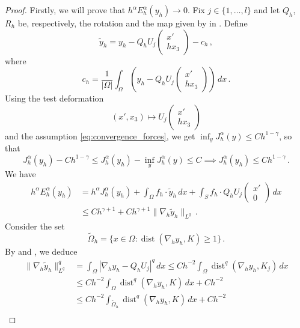 \documentclass[10pt,a4paper]{amsart}
\DeclareMathOperator{\dist}{dist}
\begin{document}
\begin{proof}
	Firstly, we will prove that $h^\alpha E_h^\alpha(y_h) \to 0$. Fix $j \in \{1, \dots, l\}$ and let $Q_h$, $R_h$ be, respectively, the rotation and the map given by in . Define
	\[
	\tilde y_h = y_h  - Q_h U_j\begin{pmatrix}
	x' \\ h x_3
	\end{pmatrix} - c_h \,,
	\] 
	where
	\[
	c_h = \dfrac{1}{|\Omega|}\int_\Omega \left(y_h - Q_h U_j \begin{pmatrix}
	x' \\ hx_3
	\end{pmatrix}\right) \, dx \,.
	\]
	Using the test deformation
	\[
	(x', x_3) \mapsto U_j \begin{pmatrix}
	x' \\ hx_3
	\end{pmatrix}
	\]
	and the assumption \eqref{eq:convergence_forces}, we get $\inf_y J_h^\alpha(y) \leq Ch^{1-\gamma}$, so that
	\[
		J_h^\alpha(y_h) - C h^{1-\gamma} \leq J_h^\alpha(y_h) - \inf_y J_h^\alpha(y) \leq C \implies J_h^\alpha(y_h) \leq Ch^{1-\gamma} \,.
	\]
	We have
	\begin{equation}\label{eq:dim_forze_eq_1}
	\begin{aligned}
	h^\alpha E_h^\alpha(y_h) & = h^\alpha J_h^\alpha(y_h) + \int_\Omega f_h \cdot \tilde y_h \, dx  + \int_S f_h \cdot Q_hU_j \begin{pmatrix}
	x' \\ 0
	\end{pmatrix} \, dx \\
	& \leq Ch^{\gamma+1} + Ch^{\gamma+1}\|\nabla_h \tilde y_h\|_{L^q} \,.
	\end{aligned}
	\end{equation}
	Consider the set
	\[
	\tilde \Omega_h = \{x \in \Omega \colon \dist(\nabla_h y_h, K) \geq 1\}\,.
	\]
	By  and , we deduce
	\begin{equation}\label{eq:dim_forze_eq_2}
		\begin{aligned}
		\|\nabla_h \tilde y_h\|_{L^q}^q & = \int_\Omega |\nabla_h y_h - Q_hU_j|^q \, dx \leq Ch^{-2} \int_\Omega \dist^q(\nabla_h y_h, K_j) \, dx\\
		& \leq Ch^{-2}\int_\Omega \dist^q(\nabla_h y_h, K) \, dx + Ch^{-2}\\
		& \leq Ch^{-2} \int_{\tilde \Omega_h} \dist^q(\nabla_h y_h, K) \, dx + Ch^{-2}\\

\end{aligned}
\end{equation}
\end{proof}
\end{document}
